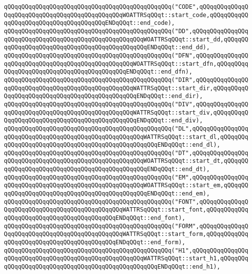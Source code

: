 \verb|qQQqqQQqqQQqqQQqqQQqqQQqqQQqqQQqqQQqqQQqqQQqqQQq("CODE",qQQqqQQqqQQqqQQqqQQqqQQqqQQqqQQqqQQqqQQqqQQqqQQqWOATTRSqQQqt::start_code,qQQqqQQqqQQqqQQqqQQqqQQqqQQqqQQqqQQqqQQqENDqQQqt::end_code),|\newline
\verb|qQQqqQQqqQQqqQQqqQQqqQQqqQQqqQQqqQQqqQQqqQQqqQQq("DD",qQQqqQQqqQQqqQQqqQQqqQQqqQQqqQQqqQQqqQQqqQQqqQQqqQQqqQQqWOATTRSqQQqt::start_dd,qQQqqQQqqQQqqQQqqQQqqQQqqQQqqQQqqQQqqQQqqQQqqQQqENDqQQqt::end_dd),|\newline
\verb|qQQqqQQqqQQqqQQqqQQqqQQqqQQqqQQqqQQqqQQqqQQqqQQq("DFN",qQQqqQQqqQQqqQQqqQQqqQQqqQQqqQQqqQQqqQQqqQQqqQQqqQQqWOATTRSqQQqt::start_dfn,qQQqqQQqqQQqqQQqqQQqqQQqqQQqqQQqqQQqqQQqqQQqENDqQQqt::end_dfn),|\newline
\verb|qQQqqQQqqQQqqQQqqQQqqQQqqQQqqQQqqQQqqQQqqQQqqQQq("DIR",qQQqqQQqqQQqqQQqqQQqqQQqqQQqqQQqqQQqqQQqqQQqqQQqqQQqWATTRSqQQqt::start_dir,qQQqqQQqqQQqqQQqqQQqqQQqqQQqqQQqqQQqqQQqqQQqqQQqENDqQQqt::end_dir),|\newline
\verb|qQQqqQQqqQQqqQQqqQQqqQQqqQQqqQQqqQQqqQQqqQQqqQQq("DIV",qQQqqQQqqQQqqQQqqQQqqQQqqQQqqQQqqQQqqQQqqQQqqQQqqQQqWATTRSqQQqt::start_div,qQQqqQQqqQQqqQQqqQQqqQQqqQQqqQQqqQQqqQQqqQQqqQQqENDqQQqt::end_div),|\newline
\verb|qQQqqQQqqQQqqQQqqQQqqQQqqQQqqQQqqQQqqQQqqQQqqQQq("DL",qQQqqQQqqQQqqQQqqQQqqQQqqQQqqQQqqQQqqQQqqQQqqQQqqQQqqQQqWATTRSqQQqt::start_dl,qQQqqQQqqQQqqQQqqQQqqQQqqQQqqQQqqQQqqQQqqQQqqQQqqQQqENDqQQqt::end_dl),|\newline
\verb|qQQqqQQqqQQqqQQqqQQqqQQqqQQqqQQqqQQqqQQqqQQqqQQq("DT",qQQqqQQqqQQqqQQqqQQqqQQqqQQqqQQqqQQqqQQqqQQqqQQqqQQqqQQqWOATTRSqQQqt::start_dt,qQQqqQQqqQQqqQQqqQQqqQQqqQQqqQQqqQQqqQQqqQQqqQQqENDqQQqt::end_dt),|\newline
\verb|qQQqqQQqqQQqqQQqqQQqqQQqqQQqqQQqqQQqqQQqqQQqqQQq("EM",qQQqqQQqqQQqqQQqqQQqqQQqqQQqqQQqqQQqqQQqqQQqqQQqqQQqqQQqWOATTRSqQQqt::start_em,qQQqqQQqqQQqqQQqqQQqqQQqqQQqqQQqqQQqqQQqqQQqqQQqENDqQQqt::end_em),|\newline
\verb|qQQqqQQqqQQqqQQqqQQqqQQqqQQqqQQqqQQqqQQqqQQqqQQq("FONT",qQQqqQQqqQQqqQQqqQQqqQQqqQQqqQQqqQQqqQQqqQQqqQQqWATTRSqQQqt::start_font,qQQqqQQqqQQqqQQqqQQqqQQqqQQqqQQqqQQqqQQqqQQqENDqQQqt::end_font),|\newline
\verb|qQQqqQQqqQQqqQQqqQQqqQQqqQQqqQQqqQQqqQQqqQQqqQQq("FORM",qQQqqQQqqQQqqQQqqQQqqQQqqQQqqQQqqQQqqQQqqQQqqQQqWATTRSqQQqt::start_form,qQQqqQQqqQQqqQQqqQQqqQQqqQQqqQQqqQQqqQQqqQQqENDqQQqt::end_form),|\newline
\verb|qQQqqQQqqQQqqQQqqQQqqQQqqQQqqQQqqQQqqQQqqQQqqQQq("H1",qQQqqQQqqQQqqQQqqQQqqQQqqQQqqQQqqQQqqQQqqQQqqQQqqQQqqQQqWATTRSqQQqt::start_h1,qQQqqQQqqQQqqQQqqQQqqQQqqQQqqQQqqQQqqQQqqQQqqQQqqQQqENDqQQqt::end_h1),|\newline
